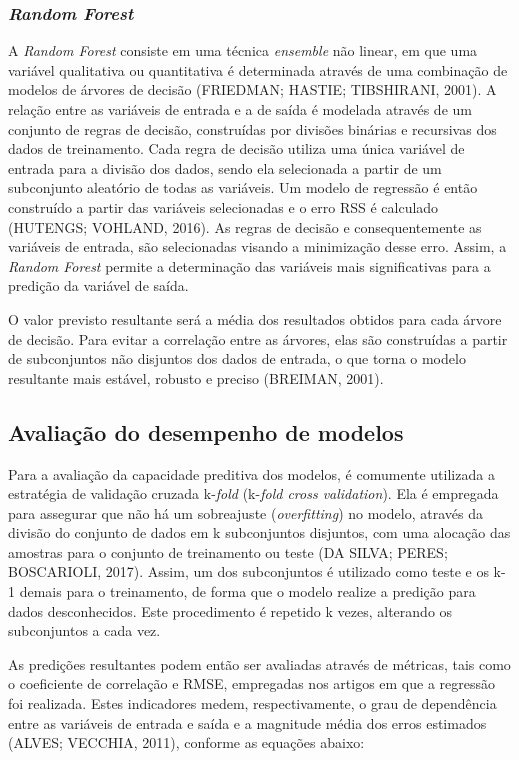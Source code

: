 \subsubsection{\textit{Random Forest}}

A \textit{Random Forest} consiste em uma técnica \textit{ensemble} não linear, em que uma variável qualitativa ou quantitativa é determinada através de uma combinação de modelos de árvores de decisão (FRIEDMAN; HASTIE; TIBSHIRANI, 2001). A relação entre as variáveis de entrada e a de saída é modelada através de um conjunto de regras de decisão, construídas por divisões binárias e recursivas dos dados de treinamento. Cada regra de decisão utiliza uma única variável de entrada para a divisão dos dados, sendo ela selecionada a partir de um subconjunto aleatório de todas as variáveis. Um modelo de regressão é então construído a partir das variáveis selecionadas e o erro RSS é calculado (HUTENGS; VOHLAND, 2016). As regras de decisão e consequentemente as variáveis de entrada, são selecionadas visando a minimização desse erro. Assim, a \textit{Random Forest} permite a determinação das variáveis mais significativas para a predição da variável de saída. 

O valor previsto resultante será a média dos resultados obtidos para cada árvore de decisão. Para evitar a correlação entre as árvores, elas são construídas a partir de subconjuntos não disjuntos dos dados de entrada, o que torna o modelo resultante mais estável, robusto e preciso (BREIMAN, 2001).

\subsection{Avaliação do desempenho de modelos}

Para a avaliação da capacidade preditiva dos modelos, é comumente utilizada a estratégia de validação cruzada k-\textit{fold} (k-\textit{fold cross validation}). Ela é empregada para assegurar que não há um sobreajuste (\textit{overfitting}) no modelo, através da divisão do conjunto de dados em k subconjuntos disjuntos, com uma alocação das amostras para o conjunto de treinamento ou teste (DA SILVA; PERES; BOSCARIOLI, 2017). Assim, um dos subconjuntos é utilizado como teste e os k-1 demais para o treinamento, de forma que o modelo realize a predição para dados desconhecidos. Este procedimento é repetido k vezes, alterando os subconjuntos a cada vez.

As predições resultantes podem então ser avaliadas através de métricas, tais como o coeficiente de correlação e RMSE, empregadas nos artigos em que a regressão foi realizada. Estes indicadores medem, respectivamente, o grau de dependência entre as variáveis de entrada e saída e a magnitude média dos erros estimados (ALVES; VECCHIA, 2011), conforme as equações abaixo:

